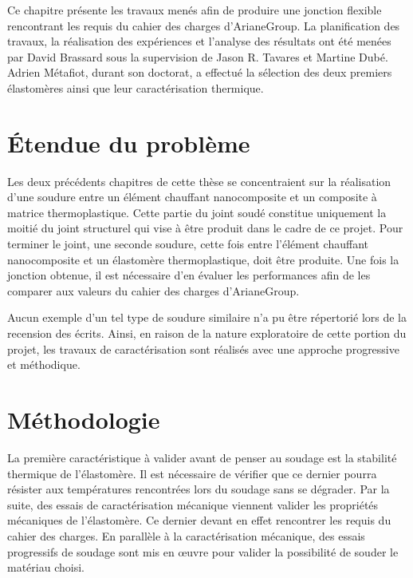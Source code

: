 \label{sec:Theme3}

Ce chapitre présente les travaux menés afin de produire une jonction flexible rencontrant les requis du cahier des charges d'ArianeGroup. 
La planification des travaux, la réalisation des expériences et l'analyse des résultats ont été menées par David Brassard sous la supervision de Jason R. Tavares et Martine Dubé. 
Adrien Métafiot, durant son doctorat, a effectué la sélection des deux premiers élastomères ainsi que leur caractérisation thermique. 

\section{Étendue du problème}

Les deux précédents chapitres de cette thèse se concentraient sur la réalisation d'une soudure entre un élément chauffant nanocomposite et un composite à matrice thermoplastique. 
Cette partie du joint soudé constitue uniquement la moitié du joint structurel qui vise à être produit dans le cadre de ce projet. 
Pour terminer le joint, une seconde soudure, cette fois entre l'élément chauffant nanocomposite et un élastomère thermoplastique, doit être produite. 
Une fois la jonction obtenue, il est nécessaire d'en évaluer les performances afin de les comparer aux valeurs du cahier des charges d'ArianeGroup. 

Aucun exemple d'un tel type de soudure similaire n'a pu être répertorié lors de la recension des écrits. 
Ainsi, en raison de la nature exploratoire de cette portion du projet, les travaux de caractérisation sont réalisés avec une approche progressive et méthodique. 

\section{Méthodologie}

La première caractéristique à valider avant de penser au soudage est la stabilité thermique de l'élastomère. 
Il est nécessaire de vérifier que ce dernier pourra résister aux températures rencontrées lors du soudage sans se dégrader. 
Par la suite, des essais de caractérisation mécanique viennent valider les propriétés mécaniques de l'élastomère.
Ce dernier devant en effet rencontrer les requis du cahier des charges. 
En parallèle à la caractérisation mécanique, des essais progressifs de soudage sont mis en œuvre pour valider la possibilité de souder le matériau choisi. 

